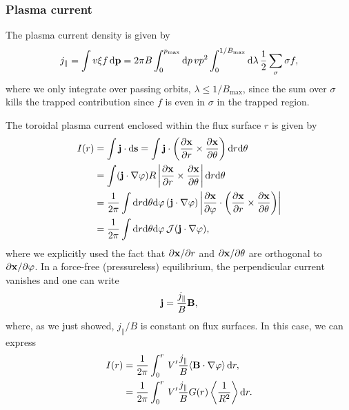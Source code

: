 \documentclass[11pt,a4paper]{article}
\newcommand{\rd}{\ensuremath{\mathrm{d}}}
\newcommand{\sub}[1]{\ensuremath{_{\text{#1}}}}
\renewcommand{\b}[1]{\ensuremath{ {\bf #1 } }}
\begin{document}
\subsubsection*{Plasma current}
The plasma current density is given by
\begin{align}
j_\parallel = \int v \xi f \,\rd\b{p} = 2\pi B\int_0^{p\sub{max}} \rd p \, vp^2 \int_0^{1/B\sub{max}} \rd \lambda \, \frac{1}{2}\sum_\sigma  \sigma f,
\end{align}
where we only integrate over passing orbits, $\lambda \leq 1/B\sub{max}$, since the sum over $\sigma$ kills the trapped contribution since $f$ is even in $\sigma$ in the trapped region.

The toroidal plasma current enclosed within the flux surface $r$ is given by
\begin{align}
I(r) &= \int \b{j}\cdot \rd\b{s} = \int \b{j}\cdot \left(\frac{\partial \b{x}}{\partial r}\times \frac{\partial \b{x}}{\partial \theta}\right) \rd r \rd \theta \nonumber \\
&= \int (\b{j}\cdot\nabla \varphi )R\left|\frac{\partial \b{x}}{\partial r}\times \frac{\partial \b{x}}{\partial \theta} \right| \rd r \rd \theta \nonumber \\
&= \frac{1}{2\pi} \int \rd r \rd\theta \rd\varphi \, (\b{j}\cdot\nabla \varphi )\left|\frac{\partial \b{x}}{\partial \varphi}\cdot\left(\frac{\partial \b{x}}{\partial r}\times \frac{\partial \b{x}}{\partial \theta} \right) \right|   \nonumber \\
&=\frac{1}{2\pi} \int \rd r \rd\theta \rd\varphi \, \mathcal{J}(\b{j}\cdot\nabla \varphi ),
\end{align}
where we explicitly used the fact that $\partial \b{x}/\partial r$ and $\partial \b{x}/\partial \theta$ are orthogonal to $\partial \b{x}/\partial \varphi$. In a force-free (pressureless) equilibrium, the perpendicular current vanishes and one can write 
\begin{align}
\b{j} = \frac{j_\parallel}{B}\b{B},
\end{align}
where, as we just showed, $j_\parallel/B$ is constant on flux surfaces. In this case, we can express
\begin{align}
I(r) &= \frac{1}{2\pi}\int_0^r \,V'\frac{j_\parallel}{B} \langle \b{B}\cdot\nabla \varphi \rangle \, \rd r, \nonumber \\
&=\frac{1}{2\pi}\int_0^r \,V'\frac{j_\parallel}{B}G(r) \left\langle \frac{1}{R^2}\right\rangle \rd r .
\end{align}
\end{document}
